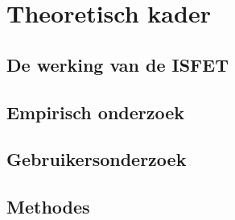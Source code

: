 \section{Theoretisch kader}

\subsection{De werking van de ISFET}\label{sec:werkingISFET}


\subsection{Empirisch onderzoek}

\subsection{Gebruikersonderzoek}

\subsection{Methodes}



